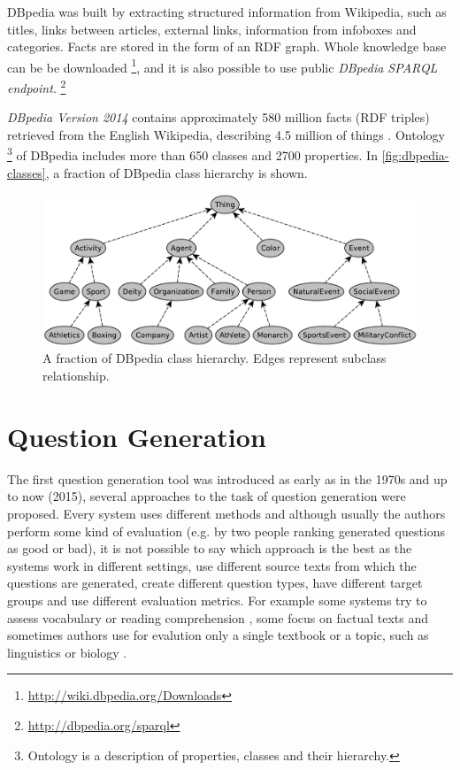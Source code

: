 \documentclass[a4paper, 12pt, twoside]{fithesis2}		%
\renewcommand{\_}{\leavevmode \kern0.07em\vbox{\hrule width0.4em}}
\begin{document}
DBpedia was built by extracting structured information from Wikipedia,
such as titles, links between articles, external links, information from infoboxes and categories.
Facts are stored in the form of an RDF graph.
Whole knowledge base can be be downloaded%
\footnote{\url{http://wiki.dbpedia.org/Downloads}}, %
and it is also possible to use public \textit{DBpedia SPARQL endpoint}.%
\footnote{\url{http://dbpedia.org/sparql}}

\emph{DBpedia Version 2014}
contains approximately 580 million facts (RDF triples) retrieved from the English Wikipedia,
describing 4.5 million of things \cite{dbpedia}.
Ontology%
\footnote{Ontology is a description of properties, classes and their hierarchy.}
of DBpedia includes more than 650 classes and 2700 properties.
In \autoref{fig:dbpedia-classes}, a fraction of DBpedia class hierarchy is shown.
\begin{figure}[h]
  \centering
  \includegraphics[width=\textwidth]{images/dbpedia-classes.pdf}
  \caption{A fraction of DBpedia class hierarchy. Edges represent subclass relationship.}
  \label{fig:dbpedia-classes}
\end{figure}


\chapter{Question Generation}
\label{chap:exercises}

The first question generation tool was introduced as early as in the 1970s \cite{questions-wolfe}
and up to now (2015), several approaches to the task of question generation were proposed.
Every system uses different methods and although usually the authors perform some kind of evaluation (e.g. by two people ranking generated questions as good or bad), it is not possible to say which approach is the best as the systems work in different settings, use different source texts from which the questions are generated, create different question types, have different target groups and use different evaluation metrics.
For example some systems try to assess vocabulary \cite{question-gen-vocabulary}
or reading comprehension \cite{question-overgenerating-rating},
some focus on factual texts \cite{question-gen-heilman}
and sometimes authors use for evalution only a single textbook or a topic, such as linguistics \cite{question-gen-mitkov} or biology \cite{question-gen-textbooks}.
\end{document}
